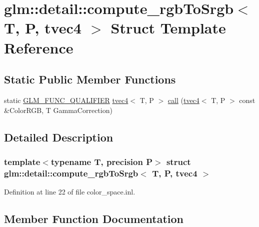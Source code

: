 \hypertarget{structglm_1_1detail_1_1compute__rgb_to_srgb_3_01_t_00_01_p_00_01tvec4_01_4}{}\section{glm\+::detail\+::compute\+\_\+rgb\+To\+Srgb$<$ T, P, tvec4 $>$ Struct Template Reference}
\label{structglm_1_1detail_1_1compute__rgb_to_srgb_3_01_t_00_01_p_00_01tvec4_01_4}
\subsection*{Static Public Member Functions}
\begin{DoxyCompactItemize}
\item 
static \mbox{\hyperlink{setup_8hpp_a33fdea6f91c5f834105f7415e2a64407}{G\+L\+M\+\_\+\+F\+U\+N\+C\+\_\+\+Q\+U\+A\+L\+I\+F\+I\+ER}} \mbox{\hyperlink{structglm_1_1tvec4}{tvec4}}$<$ T, P $>$ \mbox{\hyperlink{structglm_1_1detail_1_1compute__rgb_to_srgb_3_01_t_00_01_p_00_01tvec4_01_4_ae56f0243296dfc80da17770e0cab5edf}{call}} (\mbox{\hyperlink{structglm_1_1tvec4}{tvec4}}$<$ T, P $>$ const \&Color\+R\+GB, T Gamma\+Correction)
\end{DoxyCompactItemize}


\subsection{Detailed Description}
\subsubsection*{template$<$typename T, precision P$>$\newline
struct glm\+::detail\+::compute\+\_\+rgb\+To\+Srgb$<$ T, P, tvec4 $>$}



Definition at line 22 of file color\+\_\+space.\+inl.



\subsection{Member Function Documentation}
\mbox{\label{structglm_1_1detail_1_1compute__rgb_to_srgb_3_01_t_00_01_p_00_01tvec4_01_4_ae56f0243296dfc80da17770e0cab5edf}} 
